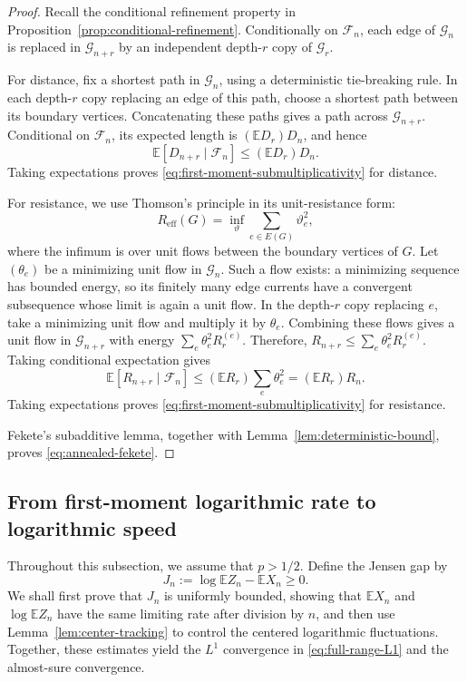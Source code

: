 \documentclass[12pt]{amsart}
\numberwithin{equation}{section}
\theoremstyle{plain}
\theoremstyle{definition}
\newcommand{\E}{\mathbb E}
\begin{document}
\begin{proof}
Recall the conditional refinement property in
Proposition~\ref{prop:conditional-refinement}.  Conditionally on
$\mathcal F_n$, each edge of $\mathcal G_n$ is replaced in
$\mathcal G_{n+r}$ by an independent depth-$r$ copy of $\mathcal G_r$.

For distance, fix a shortest path in $\mathcal G_n$, using a deterministic
tie-breaking rule.  In each depth-$r$ copy replacing an edge of this path,
choose a shortest path between its boundary vertices.  Concatenating these
paths gives a path across $\mathcal G_{n+r}$.  Conditional on $\mathcal F_n$,
its expected length is $(\E D_r)D_n$, and hence
\[
 \E[D_{n+r}\mid\mathcal F_n]\le (\E D_r)D_n.
\]
Taking expectations proves \eqref{eq:first-moment-submultiplicativity} for
distance.

For resistance, we use Thomson's principle in its unit-resistance form:
\[
 R_{\mathrm{eff}}(G)
 =\inf_{\vartheta}\sum_{e\in E(G)}\vartheta_e^2,
\]
where the infimum is over unit flows between the boundary vertices of $G$.  Let
$(\theta_e)$ be a minimizing unit flow in $\mathcal G_n$. Such a flow
exists: a minimizing sequence has bounded energy, so its finitely many edge
currents have a convergent subsequence whose limit is again a unit flow. In the
depth-$r$ copy replacing $e$, take a minimizing unit flow
and multiply it by $\theta_e$.
Combining these flows gives a unit flow in $\mathcal G_{n+r}$ with
energy $\sum_e\theta_e^2R_r^{(e)}$.  Therefore,
$R_{n+r}\le\sum_e\theta_e^2R_r^{(e)}$.
Taking conditional expectation gives
\[
 \E[R_{n+r}\mid\mathcal F_n]
 \le (\E R_r)\sum_e\theta_e^2
 = (\E R_r)R_n.
\]
Taking expectations proves \eqref{eq:first-moment-submultiplicativity} for
resistance.

Fekete's subadditive lemma, together with Lemma~\ref{lem:deterministic-bound}, proves
\eqref{eq:annealed-fekete}.
\end{proof}

\subsection{From first-moment logarithmic rate to logarithmic speed}
\label{sec:annealed-to-typical}

Throughout this subsection, we assume that $p>1/2$.  Define the Jensen gap by
\begin{equation}
\label{eq:jensen-gap}
 J_n:=\log\E Z_n-\E X_n\ge0.
\end{equation}
We shall first prove that $J_n$ is uniformly bounded, showing that $\E X_n$
and $\log\E Z_n$ have the same limiting rate after division by $n$, and then
use Lemma~\ref{lem:center-tracking} to control the centered logarithmic
fluctuations.  Together, these estimates yield the $L^1$ convergence in
\eqref{eq:full-range-L1} and the almost-sure convergence.
\end{document}
